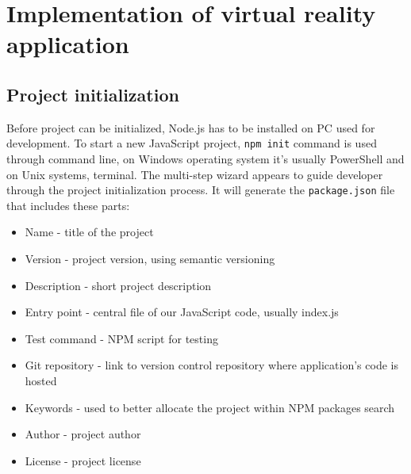 \section{Implementation of virtual reality application}

\subsection{Project initialization}
Before project can be initialized, Node.js has to be installed on PC used for development. To start a new JavaScript project, \texttt{npm init} command is used through command line, on Windows operating system it's usually PowerShell and on Unix systems, terminal. The multi-step wizard appears to guide developer through the project initialization process. It will generate the \texttt{package.json} file that includes these parts:

\begin{itemize}
\item{Name - title of the project}
\item{Version - project version, using semantic versioning}
\item{Description - short project description}
\item{Entry point - central file of our JavaScript code, usually index.js}
\item{Test command - NPM script for testing}
\item{Git repository - link to version control repository where application's code is hosted}
\item{Keywords - used to better allocate the project within NPM packages search}
\item{Author - project author}
\item{License - project license}
\end{itemize}

